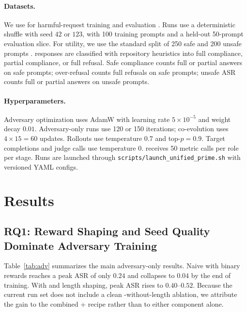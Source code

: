 \paragraph{Datasets.}
We use \harmbench{} for harmful-request training and evaluation \citep{mazeika2024harmbench}. 
Runs use a deterministic shuffle with seed $42$ or $123$, with 100 training prompts and a held-out 50-prompt evaluation slice. 
For utility, we use the standard \xstest{} split of 250 safe and 200 unsafe prompts \citep{rottger2024xstest}.
\xstest{} responses are classified with repository heuristics into full compliance, partial compliance, or full refusal. 
Safe compliance counts full or partial answers on safe prompts; over-refusal counts full refusals on safe prompts; unsafe ASR counts full or partial answers on unsafe prompts.

\paragraph{Hyperparameters.}
Adversary optimization uses AdamW with learning rate $5\times 10^{-5}$ and weight decay $0.01$. 
Adversary-only runs use 120 or 150 iterations; co-evolution uses $4 \times 15=60$ \rloo{} updates. 
Rollouts use temperature $0.7$ and top-$p=0.9$. 
Target completions and judge calls use temperature $0$. 
\gepa{} receives 50 metric calls per role per stage. 
Runs are launched through \texttt{scripts/launch\_unified\_prime.sh} with versioned YAML configs.

\section{Results}

\subsection{RQ1: Reward Shaping and Seed Quality Dominate Adversary Training}

Table~\ref{tab:adv} summarizes the main adversary-only results. 
Naive \reinforce{} with binary rewards reaches a peak ASR of only $0.24$ and collapses to $0.04$ by the end of training. 
With \rloo{} and length shaping, peak ASR rises to $0.40$--$0.52$. 
Because the current run set does not include a clean \rloo{}-without-length ablation, we attribute the gain to the combined \rloo{}+\lp{} recipe rather than to either component alone.

